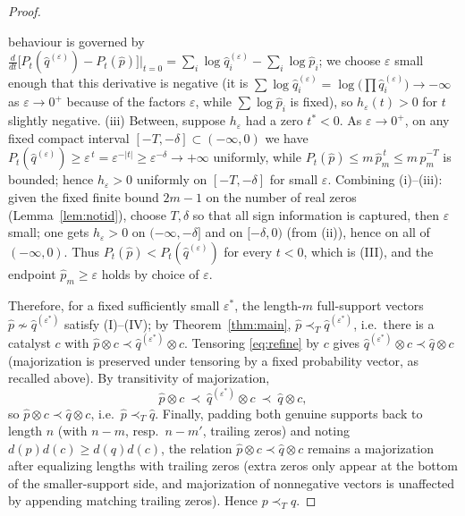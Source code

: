 \documentclass{amsart}
\theoremstyle{plain}
\theoremstyle{definition}
\newcommand{\maj}{\prec}
\newcommand{\trump}{\prec_T}
\begin{document}
\begin{proof}
\begin{itemize}
behaviour is governed by $\frac{d}{dt}\big[P_t(\hat q^{(\varepsilon)})-P_t(\hat
p)\big]\big|_{t=0}=\sum_i\log\hat q^{(\varepsilon)}_i-\sum_i\log\hat p_i$; we choose
$\varepsilon$ small enough that this derivative is negative (it is
$\sum\log\hat q^{(\varepsilon)}_i=\log\big(\prod\hat q^{(\varepsilon)}_i\big)\to-\infty$
as $\varepsilon\to0^+$ because of the factors $\varepsilon$, while
$\sum\log\hat p_i$ is fixed), so $h_\varepsilon(t)>0$ for $t$ slightly negative.
(iii) Between, suppose $h_\varepsilon$ had a zero $t^\ast<0$. As $\varepsilon\to0^+$,
on any fixed compact interval $[-T,-\delta]\subset(-\infty,0)$ we have
$P_t(\hat q^{(\varepsilon)})\ge\varepsilon^{\,t}=\varepsilon^{-|t|}\ge
\varepsilon^{-\delta}\to+\infty$ uniformly, while $P_t(\hat p)\le m\,\hat p_m^{\,t}\le
m\,\hat p_m^{-T}$ is bounded; hence $h_\varepsilon>0$ uniformly on $[-T,-\delta]$ for
small $\varepsilon$. Combining (i)--(iii): given the fixed finite bound $2m-1$ on the
number of real zeros (Lemma~\ref{lem:notid}), choose $T,\delta$ so that all sign
information is captured, then $\varepsilon$ small; one gets $h_\varepsilon>0$ on
$(-\infty,-\delta]$ and on $[-\delta,0)$ (from (ii)), hence on all of $(-\infty,0)$.
Thus $P_t(\hat p)<P_t(\hat q^{(\varepsilon)})$ for every $t<0$, which is (III), and the
endpoint $\hat p_m\ge\varepsilon$ holds by choice of $\varepsilon$.
\end{itemize}
Therefore, for a fixed sufficiently small $\varepsilon^\ast$, the length-$m$
full-support vectors $\hat p\not\sim\hat q^{(\varepsilon^\ast)}$ satisfy (I)--(IV);
by Theorem~\ref{thm:main}, $\hat p\trump\hat q^{(\varepsilon^\ast)}$, i.e.\ there is a
catalyst $c$ with $\hat p\otimes c\maj\hat q^{(\varepsilon^\ast)}\otimes c$. Tensoring
\eqref{eq:refine} by $c$ gives $\hat q^{(\varepsilon^\ast)}\otimes c\maj\hat q\otimes c$
(majorization is preserved under tensoring by a fixed probability vector, as recalled
above). By transitivity of majorization,
\[
   \hat p\otimes c\ \maj\ \hat q^{(\varepsilon^\ast)}\otimes c\ \maj\ \hat q\otimes c,
\]
so $\hat p\otimes c\maj\hat q\otimes c$, i.e.\ $\hat p\trump\hat q$. Finally, padding
both genuine supports back to length $n$ (with $n-m$, resp.\ $n-m'$, trailing zeros)
and noting $d(p)d(c)\ge d(q)d(c)$, the relation $\hat p\otimes c\maj\hat q\otimes c$
remains a majorization after equalizing lengths with trailing zeros (extra zeros only
appear at the bottom of the smaller-support side, and majorization of nonnegative
vectors is unaffected by appending matching trailing zeros). Hence $p\trump q$.
\end{proof}
\end{document}
